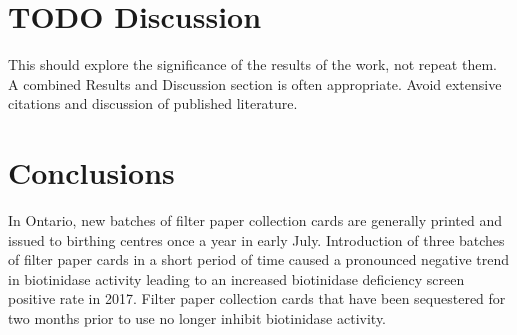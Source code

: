 \documentclass[review]{elsarticle}
\begin{document}
\clearpage

\section*{{\bfseries\sffamily TODO} Discussion}
\label{sec:org246a0b5}
This should explore the significance of the results of the work, not
repeat them. A combined Results and Discussion section is often
appropriate. Avoid extensive citations and discussion of published
literature.
\section*{Conclusions}
\label{sec:org85cd4ea}
In Ontario, new batches of filter paper collection cards are
generally printed and issued to birthing centres once a year in
early July. Introduction of three batches of filter paper cards in a
short period of time caused a pronounced negative trend in
biotinidase activity leading to an increased biotinidase deficiency
screen positive rate in 2017. Filter paper collection cards that
have been sequestered for two months prior to use no longer inhibit
biotinidase activity.
\end{document}
